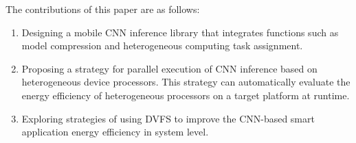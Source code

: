 \begin{enabstract}
The contributions of this paper are as follows:

\begin{enumerate}
  \item Designing a mobile CNN inference library that integrates functions such as model compression and heterogeneous computing task assignment.
  \item Proposing a strategy for parallel execution of CNN inference based on heterogeneous device processors. This strategy can automatically evaluate the energy efficiency of heterogeneous processors on a target platform at runtime.
  \item Exploring strategies of using DVFS to improve the CNN-based smart application energy efficiency in system level.
\end{enumerate}

\end{enabstract} 